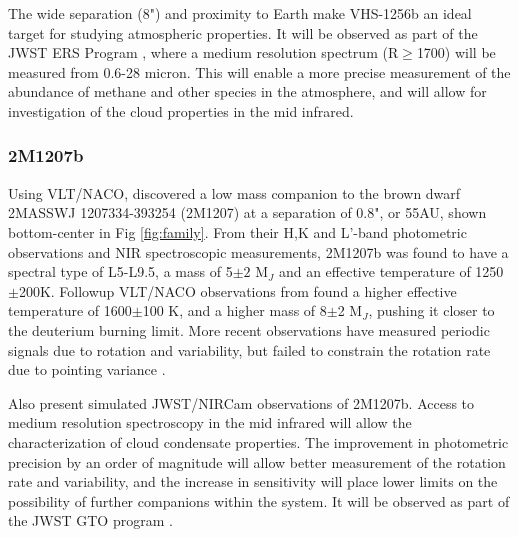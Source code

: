 The wide separation (8") and proximity to Earth make VHS-1256b an ideal target for studying atmospheric properties.
It will be observed as part of the JWST ERS Program \parencite{Hinkley2019}, where a medium resolution spectrum (R$\geq$1700) will be measured from 0.6-28 micron. 
This will enable a more precise measurement of the abundance of methane and other species in the atmosphere, and will allow for investigation of the cloud properties in the mid infrared.
\subsubsection{2M1207b}
Using VLT/NACO, \parencite{Chauvin2004} discovered a low mass companion to the brown dwarf 2MASSWJ 1207334-393254 (2M1207) at a separation of 0.8", or 55AU, shown bottom-center in Fig \ref{fig:family}. 
From their H,K and L'-band photometric observations and NIR spectroscopic measurements, 2M1207b was found to have a spectral type of L5-L9.5, a mass of 5$\pm2$ M$_{J}$ and an effective temperature of 1250$\pm$200K. Followup VLT/NACO observations from \parencite{Mohanty2007} found a higher effective temperature of 1600$\pm$100 K, and a higher mass of 8$\pm$2 M$_{J}$, pushing it closer to the deuterium burning limit. More recent observations have measured periodic signals due to rotation and variability, but failed to constrain the rotation rate due to pointing variance \parencite{Zhou2019}. 

\parencite{Zhou2019} Also present simulated JWST/NIRCam observations of 2M1207b. Access to medium resolution spectroscopy in the mid infrared will allow the characterization of cloud condensate properties. 
The improvement in photometric precision by an order of magnitude will allow better measurement of the rotation rate and variability, and the increase in sensitivity will place lower limits on the possibility of further companions within the system.
It will be observed as part of the JWST GTO program \parencite{Birkmann2019}.

